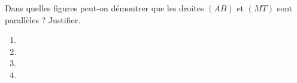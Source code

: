 
\begin{exercice}\label{exosmath-0996}

Dans quelles figures peut-on démontrer que les droites $(AB)$ et $(MT)$ sont parallèles ?  Justifier.

\begin{multicols}{2}
    \begin{enumerate}
        \item
   
\item
   
\item
   
\item
   

    \end{enumerate}
\end{multicols}


\end{exercice}

